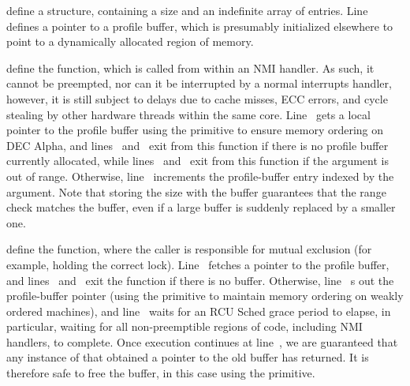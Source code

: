\begin{fcvref}
 define a  structure, containing a
size and an indefinite array of entries.
Line~ defines a pointer to a profile buffer, which is
presumably initialized elsewhere to point to a dynamically allocated
region of memory.
\end{fcvref}

\begin{fcvref}
 define the  function,
which is called from within an NMI handler.
As such, it cannot be preempted, nor can it be interrupted by a normal
interrupts handler, however, it is still subject to delays due to cache misses,
ECC errors, and cycle stealing by other hardware threads within the same
core.
Line~ gets a local pointer to the profile buffer using the
 primitive to ensure memory ordering on
DEC Alpha, and
lines~ and~ exit from this function if there is no
profile buffer currently allocated, while lines~ and~
exit from this function if the  argument
is out of range.
Otherwise, line~ increments the profile-buffer entry indexed
by the  argument.
Note that storing the size with the buffer guarantees that the
range check matches the buffer, even if a large buffer is suddenly
replaced by a smaller one.
\end{fcvref}

\begin{fcvref}
 define the  function,
where the caller is responsible for mutual exclusion (for example,
holding the correct lock).
Line~ fetches a pointer to the profile buffer, and
lines~ and~ exit the function if there is no buffer.
Otherwise, line~ s out the profile-buffer pointer
(using the  primitive to maintain
memory ordering on weakly ordered machines),
and line~ waits for an RCU Sched grace period to elapse,
in particular, waiting for all non-preemptible regions of code,
including NMI handlers, to complete.
Once execution continues at line~, we are guaranteed that
any instance of  that obtained a
pointer to the old buffer has returned.
It is therefore safe to free the buffer, in this case using the
 primitive.
\end{fcvref}

